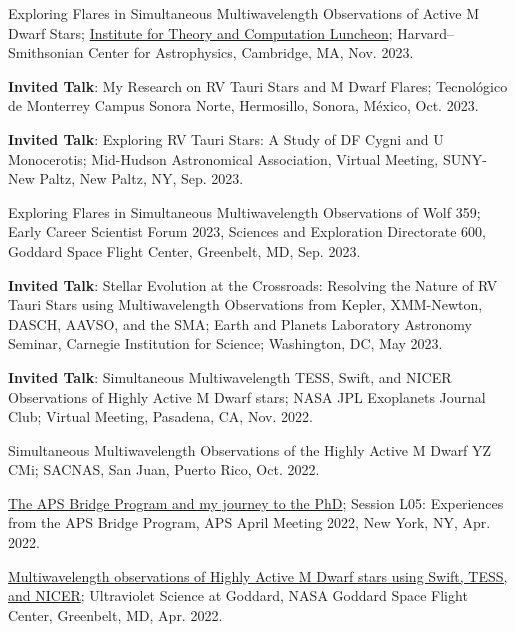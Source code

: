 \documentclass[12pt]{article}
\begin{document}
\begin{etaremune}
\item Exploring Flares in Simultaneous Multiwavelength Observations of Active M Dwarf Stars; \href{https://itc.cfa.harvard.edu/event/itc-luncheon-112}{Institute for Theory and Computation Luncheon}; Harvard--Smithsonian Center for Astrophysics, Cambridge, MA, Nov. 2023.

\item \textbf{Invited Talk}: My Research on RV Tauri Stars and M Dwarf Flares; Tecnol\'{o}gico de Monterrey Campus Sonora Norte, Hermosillo, Sonora, M\'{e}xico, Oct. 2023.

\item \textbf{Invited Talk}: Exploring RV Tauri Stars: A Study of DF Cygni and U Monocerotis; Mid-Hudson Astronomical Association, Virtual Meeting, SUNY-New Paltz, New Paltz, NY, Sep. 2023.

\item Exploring Flares in Simultaneous Multiwavelength Observations of Wolf 359; Early Career Scientist Forum 2023, Sciences and Exploration Directorate 600, Goddard Space Flight Center, Greenbelt, MD, Sep. 2023.

\item \textbf{Invited Talk}: Stellar Evolution at the Crossroads: Resolving the Nature of RV Tauri Stars using Multiwavelength Observations from Kepler, XMM-Newton, DASCH, AAVSO, and the SMA; Earth and Planets Laboratory Astronomy Seminar, Carnegie Institution for Science; Washington, DC, May 2023.

\item \textbf{Invited Talk}: Simultaneous Multiwavelength TESS, Swift, and NICER Observations of Highly Active M Dwarf stars; NASA JPL Exoplanets Journal Club; Virtual Meeting, Pasadena, CA, Nov. 2022.

\item Simultaneous Multiwavelength Observations of the Highly Active M Dwarf YZ CMi; SACNAS, San Juan, Puerto Rico, Oct. 2022.

\item \href{https://meetings.aps.org/Meeting/APR22/Session/L05.1}{The APS Bridge Program and my journey to the PhD}; Session L05: Experiences from the APS Bridge Program, APS April Meeting 2022, New York, NY, Apr. 2022.

\item \href{https://asd.gsfc.nasa.gov/conferences/UVsymposium2022/agenda/}{Multiwavelength observations of Highly Active M Dwarf stars using Swift, TESS, and NICER}; Ultraviolet Science at Goddard, NASA Goddard Space Flight Center, Greenbelt, MD, Apr. 2022.


\end{etaremune}
\end{document}
